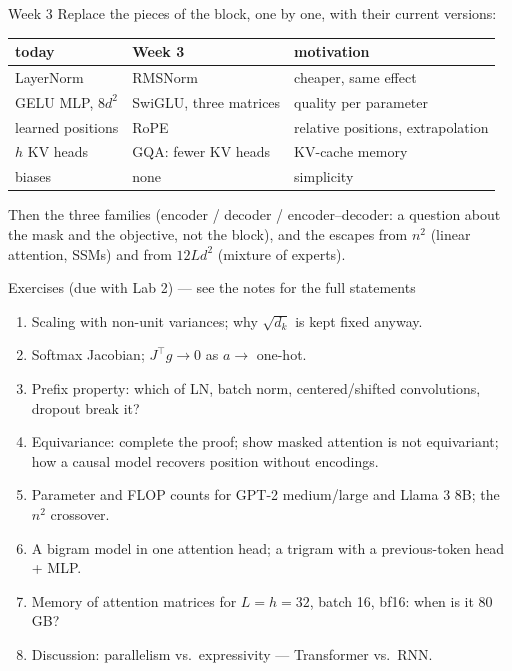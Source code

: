 \documentclass[11pt,aspectratio=169]{beamer}
\newcommand{\T}{^{\top}}
\begin{document}
\begin{frame}{Week 3}
  Replace the pieces of the block, one by one, with their current versions:
  \begin{center}
  \begin{tabular}{@{}lll@{}}
    \toprule
    today & Week 3 & motivation \\
    \midrule
    LayerNorm & RMSNorm & cheaper, same effect \\
    GELU MLP, $8d^2$ & SwiGLU, three matrices & quality per parameter \\
    learned positions & RoPE & relative positions, extrapolation \\
    $h$ KV heads & GQA: fewer KV heads & KV-cache memory \\
    biases & none & simplicity \\
    \bottomrule
  \end{tabular}
  \end{center}

  \vspace{0.8em}
  Then the three families (encoder / decoder / encoder--decoder: a question about the mask
  and the objective, not the block), and the escapes from $n^2$ (linear attention, SSMs)
  and from $12Ld^2$ (mixture of experts).
\end{frame}

\begin{frame}{Exercises (due with Lab 2) --- see the notes for the full statements}
  \begin{enumerate}
    \item Scaling with non-unit variances; why $\sqrt{d_k}$ is kept fixed anyway.
    \item Softmax Jacobian; $J\T g\to 0$ as $a\to$ one-hot.
    \item Prefix property: which of LN, batch norm, centered/shifted convolutions, dropout
          break it?
    \item Equivariance: complete the proof; show masked attention is not equivariant; how a
          causal model recovers position without encodings.
    \item Parameter and FLOP counts for GPT-2 medium/large and Llama 3 8B; the $n^2$ crossover.
    \item A bigram model in one attention head; a trigram with a previous-token head + MLP.
    \item Memory of attention matrices for $L = h = 32$, batch 16, bf16: when is it 80 GB?
    \item Discussion: parallelism vs.\ expressivity --- Transformer vs.\ RNN.
  \end{enumerate}
\end{frame}
\end{document}
